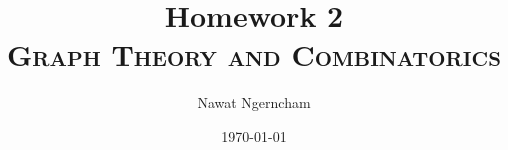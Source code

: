 \documentclass[answers]{exam}
\title{\Huge{{Homework 2}}
	\\
\Large\scshape{{Graph Theory and Combinatorics}}}
\author{{Nawat Ngerncham}}
\date{\today}
\begin{document}
\maketitle

\begin{questions}
  
  
  
  
  
  
\end{questions}



\end{document}
